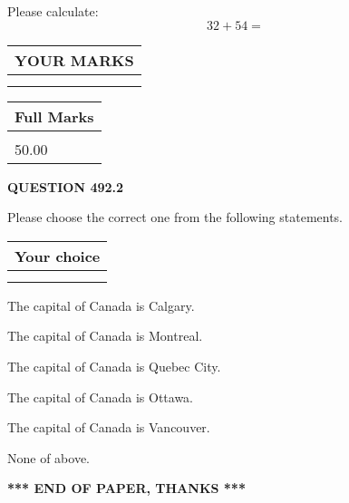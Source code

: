 \documentclass[12pt]{article}
\begin{document}
  
 
Please calculate:
\begin{equation}
32 +  %
54 = \nonumber
\end{equation}
 

 

 
  
\vspace{0.2in}
  
\noindent\begin{tabular}{|l|}
\hline
 YOUR MARKS  \\
\hline
 \\ 
 \\ 
\hline
\end{tabular}
\hspace{0.05in} \begin{tabular}{|l|}
\hline
 Full Marks  \\
\hline
 \\ 
50.00 \\
\hline
\end{tabular}
{\textbf{\Large{QUESTION
492.2 
}}}
  
  
Please choose the correct one from the following statements.
  
  
\noindent\hspace{3.0in} \begin{tabular}{|l|}
\hline
Your choice \\
\hline
 \\ 
 \\ 
\hline
\end{tabular}
  
  
 
 
The capital of Canada is Calgary.
 
 
The capital of Canada is Montreal.
 
 
The capital of Canada is Quebec City.
 
 
The capital of Canada is Ottawa.
 
 
The capital of Canada is Vancouver.
 
 
 None of above.
 
 
   
   
 \vspace{0.2in}
 
   
   
   
   
\vspace{1.0in} 
{\textbf{\large{ *** END OF PAPER, THANKS *** }}} 
   
\end{document}
